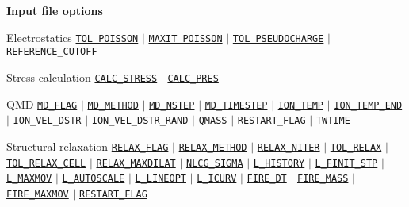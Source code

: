 \begin{frame}[allowframebreaks]{\textbf{Input file options}}
\vspace{-2mm}
\begin{block}{Electrostatics}
\hyperlink{TOL_POISSON}{\texttt{TOL\_POISSON}} $\vert$ \hyperlink{MAXIT_POISSON}{\texttt{MAXIT\_POISSON}} $\vert$ \hyperlink{TOL_PSEUDOCHARGE}{\texttt{TOL\_PSEUDOCHARGE}} $\vert$ \hyperlink{REFERENCE_CUTOFF}{\texttt{REFERENCE\_CUTOFF}} 
\end{block}

\vspace{-2mm}
\begin{block}{Stress calculation}
\hyperlink{CALC_STRESS}{\texttt{CALC\_STRESS}} $\vert$ \hyperlink{CALC_PRES}{\texttt{CALC\_PRES}}
\end{block}
\vspace{-2mm}

\begin{block}{QMD}
\hyperlink{MD_FLAG}{\texttt{MD\_FLAG}} $\vert$ \hyperlink{MD_METHOD}{\texttt{MD\_METHOD}} $\vert$ \hyperlink{MD_NSTEP}{\texttt{MD\_NSTEP}} $\vert$ \hyperlink{MD_TIMESTEP}{\texttt{MD\_TIMESTEP}} $\vert$ \hyperlink{ION_TEMP}{\texttt{ION\_TEMP}} $\vert$ \hyperlink{ION_TEMP_END}{\texttt{ION\_TEMP\_END}} $\vert$ \hyperlink{ION_VEL_DSTR}{\texttt{ION\_VEL\_DSTR}} $\vert$ \hyperlink{ION_VEL_DSTR_RAND}{\texttt{ION\_VEL\_DSTR\_RAND}} $\vert$ \hyperlink{QMASS}{\texttt{QMASS}} $\vert$
\hyperlink{RESTART_FLAG}{\texttt{RESTART\_FLAG}} $\vert$ \hyperlink{TWTIME}{\texttt{TWTIME}}
\end{block}
\vspace{-2mm}
\begin{block}{Structural relaxation}
\hyperlink{RELAX_FLAG}{\texttt{RELAX\_FLAG}} $\vert$ \hyperlink{RELAX_METHOD}{\texttt{RELAX\_METHOD}} $\vert$ \hyperlink{RELAX_NITER}{\texttt{RELAX\_NITER}} $\vert$ \hyperlink{TOL_RELAX}{\texttt{TOL\_RELAX}} $\vert$ \hyperlink{TOL_RELAX_CELL}{\texttt{TOL\_RELAX\_CELL}} $\vert$ \hyperlink{RELAX_MAXDILAT}{\texttt{RELAX\_MAXDILAT}} $\vert$ \hyperlink{NLCG_SIGMA}{\texttt{NLCG\_SIGMA}} $\vert$ \hyperlink{L_HISTORY}{\texttt{L\_HISTORY}} $\vert$ \hyperlink{L_FINIT_STP}{\texttt{L\_FINIT\_STP}} $\vert$ \hyperlink{L_MAXMOV}{\texttt{L\_MAXMOV}} $\vert$ \hyperlink{L_AUTOSCALE}{\texttt{L\_AUTOSCALE}} $\vert$ \hyperlink{L_LINEOPT}{\texttt{L\_LINEOPT}} $\vert$ \hyperlink{L_ICURV}{\texttt{L\_ICURV}} $\vert$ \hyperlink{FIRE_DT}{\texttt{FIRE\_DT}} $\vert$ \hyperlink{FIRE_MASS}{\texttt{FIRE\_MASS}} $\vert$ \hyperlink{FIRE_MAXMOV}{\texttt{FIRE\_MAXMOV}} $\vert$ \hyperlink{RESTART_FLAG}{\texttt{RESTART\_FLAG}}
\end{block}


\end{frame}
